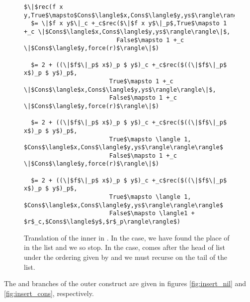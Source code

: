\begin{figure}[H]
\caption{Translation of the inner  in .
In the  case, we have found the place of  in the list and we so stop.
In the  case,  comes after the head of list under the ordering given by  and we must recurse on the tail of the list.
}
\label{fig:insert_inner_rec}
\begin{lstlisting}
$\|$rec(f x y,True$\mapsto$Cons$\langle$x,Cons$\langle$y,ys$\rangle\rangle$,False$\mapsto$Cons$\langle$y,force(r)$\rangle$)$\|$
  $= \|$f x y$\|_c +_c$rec($\|$f x y$\|_p$,True$\mapsto 1 +_c \|$Cons$\langle$x,Cons$\langle$y,ys$\rangle\rangle\|$,
                          False$\mapsto 1 +_c \|$Cons$\langle$y,force(r)$\rangle\|$)

  $= 2 + ((\|$f$\|_p$ x$)_p $ y$)_c +_c$rec($((\|$f$\|_p$ x$)_p $ y$)_p$,
                        True$\mapsto 1 +_c \|$Cons$\langle$x,Cons$\langle$y,ys$\rangle\rangle\|$,
                        False$\mapsto 1 +_c \|$Cons$\langle$y,force(r)$\rangle\|$)

  $= 2 + ((\|$f$\|_p$ x$)_p $ y$)_c +_c$rec($((\|$f$\|_p$ x$)_p $ y$)_p$,
                        True$\mapsto \langle 1, $Cons$\langle$x,Cons$\langle$y,ys$\rangle\rangle\rangle$
                        False$\mapsto 1 +_c \|$Cons$\langle$y,force(r)$\rangle\|$)

  $= 2 + ((\|$f$\|_p$ x$)_p $ y$)_c +_c$rec($((\|$f$\|_p$ x$)_p $ y$)_p$,
                        True$\mapsto \langle 1, $Cons$\langle$x,Cons$\langle$y,ys$\rangle\rangle\rangle$
                        False$\mapsto \langle1 + $r$_c,$Cons$\langle$y$,$r$_p\rangle\rangle$)

\end{lstlisting}
\end{figure}


The  and  branches of the outer  construct are given in figures \ref{fig:insert_nil} and \ref{fig:insert_cons}, respectively.

